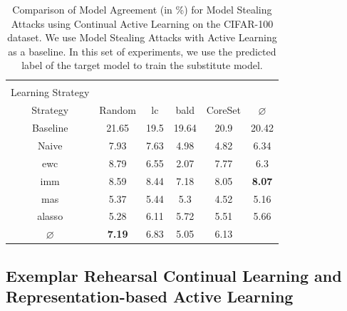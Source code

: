 \begin{table}[h]
    \centering
    \begin{tabular}{c | c c c c | c} 
        \hline
        \diagbox[width=11em]{Active \\ Learning Strategy}{Continual Learning \\ Strategy} & Random & \gls{lc} & \gls{bald} & CoreSet & $\varnothing$\\ 
        \hline 
        Baseline & 21.65 & 19.5 & 19.64 & 20.9 & 20.42\\
        \hline
        Naive & 7.93 & 7.63 & 4.98 & 4.82 & 6.34\\
        \gls{ewc} & 8.79 & 6.55 & 2.07 & 7.77 & 6.3\\
        \gls{imm} & 8.59 & 8.44 & 7.18 & 8.05 & \textbf{8.07}\\
        \gls{mas} & 5.37 & 5.44 & 5.3 & 4.52 & 5.16\\
        \gls{alasso} & 5.28 & 6.11 & 5.72 & 5.51 & 5.66\\
        \hline
        $\varnothing$ & \textbf{7.19} & 6.83 & 5.05 & 6.13 \\
        \hline
    \end{tabular}
    \caption[Model agreement of Continual Learning strategies on CIFAR-100 using the predicted class label]{Comparison of Model Agreement (in \%) for Model Stealing Attacks using
    Continual Active Learning on the CIFAR-100 dataset. We use Model Stealing Attacks with Active Learning as a baseline. In this set of experiments,
    we use the predicted label of the target model to train the substitute model.}
    \label{fig:ModelStealingCIFAR100Label}
\end{table}

\subsection{Exemplar Rehearsal Continual Learning and Representation-based Active Learning}
\label{sec:Evaluation:CALMS:VAAL_AGEM}


